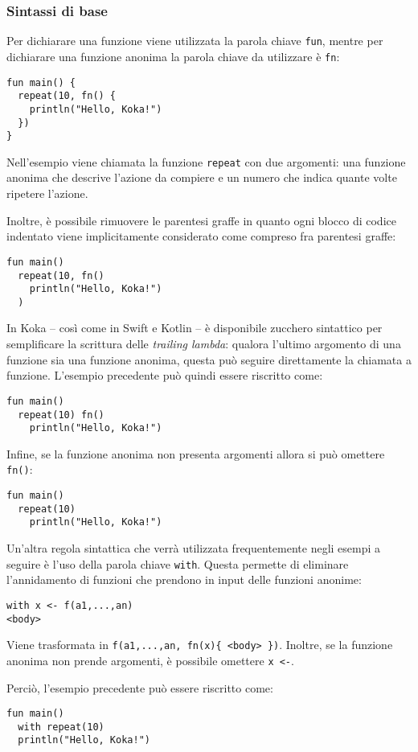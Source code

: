 \subsubsection{Sintassi di base}
Per dichiarare una funzione viene utilizzata la parola chiave \lstinline{fun}, mentre per dichiarare una funzione anonima la parola chiave da utilizzare è \lstinline{fn}:
\begin{lstlisting}[language=koka]
fun main() {
  repeat(10, fn() {
    println("Hello, Koka!")
  })
}
\end{lstlisting}
Nell'esempio viene chiamata la funzione \lstinline{repeat} con due argomenti: una funzione anonima che descrive l'azione da compiere e un numero che indica quante volte ripetere l'azione.

Inoltre, è possibile rimuovere le parentesi graffe in quanto ogni blocco di codice indentato viene implicitamente considerato come compreso fra parentesi graffe:
\begin{lstlisting}[language=koka]
fun main()
  repeat(10, fn()
    println("Hello, Koka!")
  )
\end{lstlisting}

In Koka -- così come in Swift e Kotlin -- è disponibile zucchero sintattico per semplificare la scrittura delle \emph{trailing lambda}: qualora l'ultimo argomento di una funzione sia una funzione anonima, questa può seguire direttamente la chiamata a funzione. L'esempio precedente può quindi essere riscritto come:
\begin{lstlisting}[language=koka]
fun main()
  repeat(10) fn()
    println("Hello, Koka!")
\end{lstlisting}
Infine, se la funzione anonima non presenta argomenti allora si può omettere \lstinline{fn()}:
\begin{lstlisting}[language=koka]
fun main()
  repeat(10)
    println("Hello, Koka!")
\end{lstlisting}

Un'altra regola sintattica che verrà utilizzata frequentemente negli esempi a seguire è l'uso della parola chiave \lstinline{with}. Questa permette di eliminare l'annidamento di funzioni che prendono in input delle funzioni anonime:
\begin{lstlisting}
with x <- f(a1,...,an)
<body>
\end{lstlisting}
Viene trasformata in \lstinline|f(a1,...,an, fn(x){ <body> })|. Inoltre, se la funzione anonima non prende argomenti, è possibile omettere \lstinline{x <-}.

Perciò, l'esempio precedente può essere riscritto come:
\begin{lstlisting}[language=koka]
fun main()
  with repeat(10)
  println("Hello, Koka!")
\end{lstlisting}

